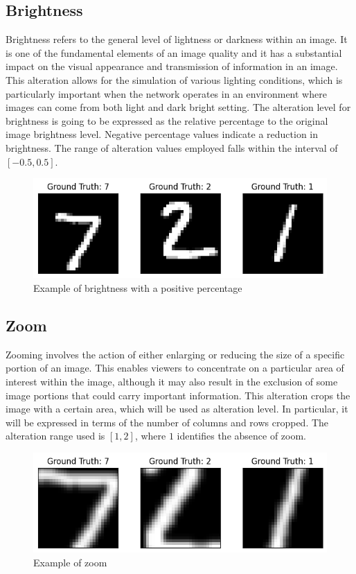 \subsection{Brightness}

Brightness refers to the general level of lightness or darkness within an image. It is one of the fundamental elements of an image quality and it has a substantial impact on the visual appearance and transmission of information in an image. This alteration allows for the simulation of various lighting conditions, which is particularly important when the network operates in an environment where images can come from both light and dark bright setting. The alteration level for brightness is going to be expressed as the relative percentage to the original image brightness level. Negative percentage values indicate a reduction in brightness. The range of alteration values employed falls within the interval of $[-0.5, 0.5]$.

\begin{figure}[h]
	\centering
	\includegraphics[width=0.6\linewidth]{ImageFiles/Alterations/Brightness}
	\caption{Example of brightness with a positive percentage}
	\label{fig:Brightness}
\end{figure}

\subsection{Zoom}
Zooming involves the action of either enlarging or reducing the size of a specific portion of an image. This enables viewers to concentrate on a particular area of interest within the image, although it may also result in the exclusion of some image portions that could carry important information. This alteration crops the image with a certain area, which will be used as alteration level. In particular, it will be expressed in terms of the number of columns and rows cropped. The alteration range used is $[1,2]$, where $1$ identifies the absence of zoom.

\begin{figure}[h]
	\centering
	\includegraphics[width=0.6\linewidth]{ImageFiles/Alterations/Zoom}
	\caption{Example of zoom}
	\label{fig:Zoom}
\end{figure}

